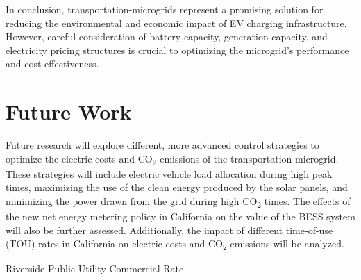 \documentclass[conference]{IEEEtran}
\begin{document}
	In conclusion, transportation-microgrids represent a promising solution for reducing the environmental and economic impact of EV charging infrastructure. However, careful consideration of battery capacity, generation capacity, and electricity pricing structures is crucial to optimizing the microgrid's performance and cost-effectiveness.
	\section{Future Work}
		  Future research will explore different, more advanced control strategies to optimize the electric costs and CO\textsubscript{2} emissions of the transportation-microgrid. These strategies will include electric vehicle load allocation during high peak times, maximizing the use of the clean energy produced by the solar panels, and minimizing the power drawn from the grid during high CO\textsubscript{2} times. The effects of the new net energy metering policy in California on the value of the BESS system will also be further assessed. Additionally, the impact of different time-of-use (TOU) rates in California on electric costs and CO\textsubscript{2} emissions will be analyzed.
		
		
	\begin{table}
		\caption{Riverside Public Utility Commercial Rate}
		\normalsize
		\centering
		
		\normalsize
		\label{tab:rpu}
	\end{table}	
\end{document}

